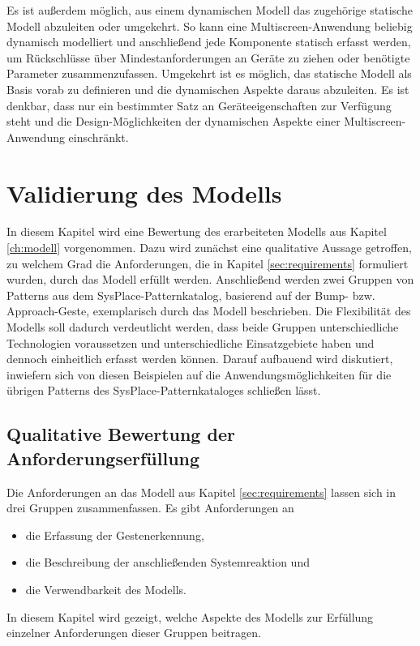 Es ist außerdem möglich, aus einem dynamischen Modell das zugehörige statische Modell abzuleiten oder umgekehrt. So kann eine Multiscreen-Anwendung beliebig dynamisch modelliert und anschließend jede Komponente statisch erfasst werden, um Rückschlüsse über Mindestanforderungen an Geräte zu ziehen oder benötigte Parameter zusammenzufassen. Umgekehrt ist es möglich, das statische Modell als Basis vorab zu definieren und die dynamischen Aspekte daraus abzuleiten. Es ist \zb denkbar, dass nur ein bestimmter Satz an Geräteeigenschaften zur Verfügung steht und die Design-Möglichkeiten der dynamischen Aspekte einer Multiscreen-Anwendung einschränkt.

\chapter{Validierung des Modells}
\label{ch:validierung}

In diesem Kapitel wird eine Bewertung des erarbeiteten Modells aus Kapitel \ref{ch:modell} vorgenommen. Dazu wird zunächst eine qualitative Aussage getroffen, zu welchem Grad die Anforderungen, die in Kapitel \ref{sec:requirements} formuliert wurden, durch das Modell erfüllt werden. Anschließend werden zwei Gruppen von Patterns aus dem SysPlace-Patternkatalog, basierend auf der Bump- bzw. Approach-Geste, exemplarisch durch das Modell beschrieben. Die Flexibilität des Modells soll dadurch verdeutlicht werden, dass beide Gruppen unterschiedliche Technologien voraussetzen und unterschiedliche Einsatzgebiete haben und dennoch einheitlich erfasst werden können. Darauf aufbauend wird diskutiert, inwiefern sich von diesen Beispielen auf die Anwendungsmöglichkeiten für die übrigen Patterns des SysPlace-Patternkataloges schließen lässt.

\section{Qualitative Bewertung der Anforderungserfüllung}
Die Anforderungen an das Modell aus Kapitel \ref{sec:requirements} lassen sich in drei Gruppen zusammenfassen. Es gibt Anforderungen an
\begin{itemize}
\item die Erfassung der Gestenerkennung,
\item die Beschreibung der anschließenden Systemreaktion und
\item die Verwendbarkeit des Modells.
\end{itemize}
In diesem Kapitel wird gezeigt, welche Aspekte des Modells zur Erfüllung einzelner Anforderungen dieser Gruppen beitragen. 


